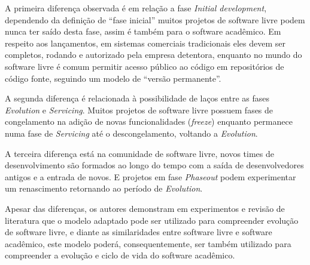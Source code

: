 A primeira diferença observada é em relação a fase {\it Initial development},
dependendo da definição de ``fase inicial'' muitos projetos de software livre
podem nunca ter saído desta fase, assim é também para o software acadêmico. Em respeito aos lançamentos,
em sistemas comerciais tradicionais eles devem ser completos, rodando e autorizado
pela empresa detentora, enquanto no mundo do software livre é comum
permitir acesso público ao código em repositórios de código fonte, seguindo
um modelo de ``versão permanente''.

A segunda diferença é relacionada à possibilidade de laços entre
as fases {\it Evolution} e {\it Servicing}. Muitos projetos de software livre
possuem fases de congelamento na adição de novas funcionalidades ({\it freeze})
enquanto permanece numa fase de {\it Servicing} até o descongelamento, voltando
a {\it Evolution}.

A terceira diferença está na comunidade de software livre,
novos times de desenvolvimento são formados ao longo do tempo
com a saída de desenvolvedores antigos e a entrada de novos.
E projetos em fase {\it Phaseout} podem experimentar um renascimento
retornando ao período de {\it Evolution}.

Apesar das diferenças, os autores  demonstram em experimentos e
revisão de literatura que o modelo adaptado pode ser utilizado para
compreender evolução de software livre, e diante as similaridades entre software livre
e software acadêmico, este modelo poderá, consequentemente, ser também
utilizado para compreender a evolução e ciclo de vida do software acadêmico.
